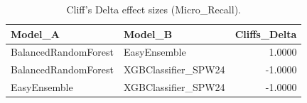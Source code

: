 \begin{table}[t]
\centering
\begin{tabular}{llr}
\toprule
Model_A & Model_B & Cliffs_Delta \\
\midrule
BalancedRandomForest & EasyEnsemble & 1.0000 \\
BalancedRandomForest & XGBClassifier_SPW24 & -1.0000 \\
EasyEnsemble & XGBClassifier_SPW24 & -1.0000 \\
\bottomrule
\end{tabular}
\caption{Cliff's Delta effect sizes (Micro_Recall).}
\label{tab:cliffs_Micro_Recall}
\end{table}